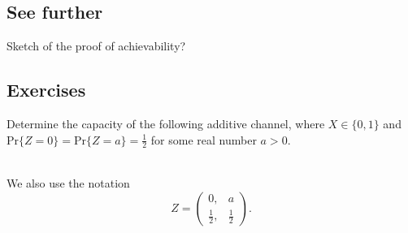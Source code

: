 % 


\subsection{See further}

Sketch of the proof of achievability?



\subsection{Exercises}

\begin{exercise}
Determine the capacity of the following additive channel, where $X \in \{0,1\}$ and $\mathrm{Pr}\{Z = 0\} = \mathrm{Pr}\{Z = a\} = \frac{1}{2}$ for some real number $a > 0$.\\
~\\
\begin{center}
\end{center}
\end{exercise}

\begin{remark}
We also use the notation 
$$
	Z = \begin{pmatrix}
		0, & a\\
		\frac{1}{2}, & \frac{1}{2}
	\end{pmatrix}.
$$
\end{remark}



